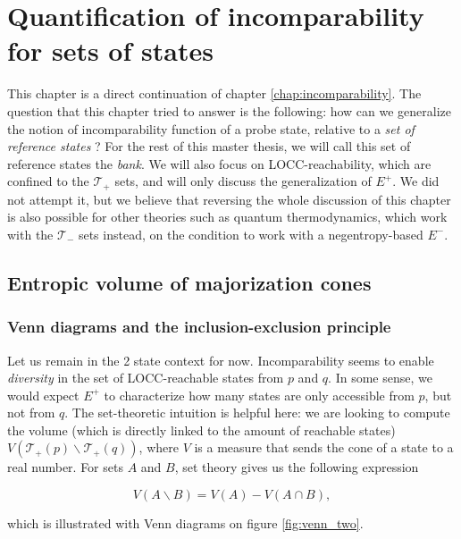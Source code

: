 \chapter{Quantification of incomparability for sets of states} \label{chap:volume}

This chapter is a direct continuation of chapter \ref{chap:incomparability}. The question that this chapter tried to answer is the following: how can we generalize the notion of incomparability function of a probe state, relative to a \textit{set of reference states} ? For the rest of this master thesis, we will call this set of reference states the \textit{bank}. We will also focus on LOCC-reachability, which are confined to the $\mathcal{T}_+$ sets, and will only discuss the generalization of $E^+$. We did not attempt it, but we believe that reversing the whole discussion of this chapter is also possible for other theories such as quantum thermodynamics, which work with the $\mathcal{T}_-$ sets instead, on the condition to work with a negentropy-based $E^-$.



\section{Entropic volume of majorization cones}

\subsection{Venn diagrams and the inclusion-exclusion principle}

Let us remain in the 2 state context for now. Incomparability seems to enable \textit{diversity} in the set of LOCC-reachable states from $p$ and $q$. In some sense, we would expect $E^+$ to characterize how many states are only accessible from $p$, but not from $q$. The set-theoretic intuition is helpful here: we are looking to compute the volume (which is directly linked to the amount of reachable states) $V(\mathcal{T}_+(p) \backslash \mathcal{T}_+(q))$, where $V$ is a measure that sends the cone of a state to a real number. For sets $A$ and $B$, set theory gives us the following expression

\begin{equation} \label{eq:2_set_exclusion}
    V(A \backslash B) = V(A) - V(A \cap B),
\end{equation}

\noindent which is illustrated with Venn diagrams on figure \ref{fig:venn_two}.

